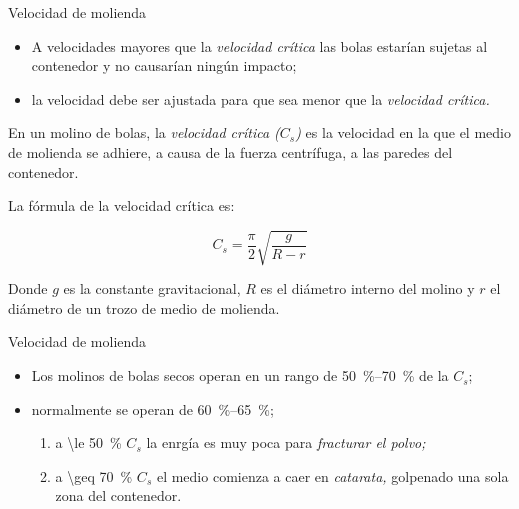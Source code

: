 \documentclass[%
spanish,
progressbar=head,
background=dark,
subsectionpage
]{beamer}
\begin{document}
\begin{frame}{Velocidad de molienda}
    \small
    \begin{itemize}
        \item A velocidades mayores que la \textit{velocidad crítica} las bolas estarían sujetas al contenedor y no causarían ningún impacto;
        \item la velocidad debe ser ajustada para que sea menor que la \emph{velocidad crítica.} 
    \end{itemize}

    \begin{tcolorbox}[title={Velocidad crítica, \(C_s\):}]
        \small
        En un molino de bolas, la \emph{velocidad crítica (\(C_s\))} es la velocidad en la que el medio de molienda se adhiere, a causa de la fuerza centrífuga, a las paredes del contenedor.
        
        La fórmula de la velocidad crítica es:

        \begin{equation}
            C_s = \frac{\pi}{2}\sqrt{\frac{g}{R-r}}
        \end{equation}

        Donde \(g\) es la constante gravitacional, \(R\) es el diámetro interno del molino y \(r\) el diámetro de un trozo de medio de molienda. 
    \end{tcolorbox}
\end{frame}

\begin{frame}{Velocidad de molienda}
    \begin{itemize}
        \item Los molinos de bolas secos operan en un rango de \qtyrange{50}{70}{\percent} de la \(C_s\);
        \item normalmente se operan de \qtyrange{60}{65}{\percent};
        \begin{enumerate}
            \item a \qty{\le 50}{\percent} \(C_s\) la enrgía es muy poca para \emph{fracturar el polvo;}
            \item a \qty{\geq 70}{\percent} \(C_s\) el medio comienza a caer en \emph{catarata,} golpenado una sola zona del contenedor.
        \end{enumerate}
    \end{itemize} 
\end{frame}
\end{document}
